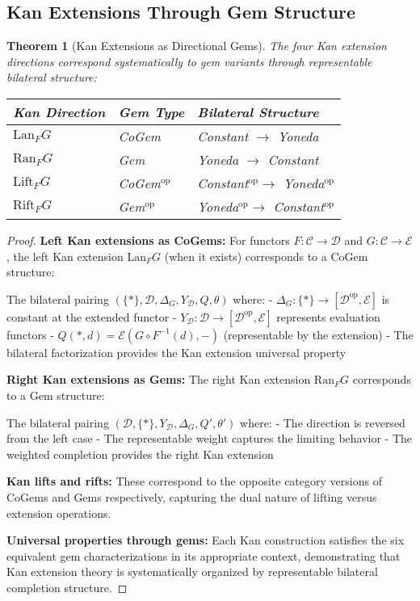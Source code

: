 \documentclass[11pt]{article}
\theoremstyle{plain}
\newtheorem{theorem}{Theorem}[section]
\theoremstyle{definition}
\theoremstyle{remark}
\newcommand{\C}{\mathcal{C}}
\newcommand{\D}{\mathcal{D}}
\newcommand{\E}{\mathcal{E}}
\newcommand{\op}{\mathrm{op}}
\begin{document}
\subsection{Kan Extensions Through Gem Structure}

\begin{theorem}[Kan Extensions as Directional Gems]\label{thm:kan-extensions-gems}
The four Kan extension directions correspond systematically to gem variants through representable bilateral structure:

\begin{center}
\begin{tabular}{|l|l|l|}
\hline
\textbf{Kan Direction} & \textbf{Gem Type} & \textbf{Bilateral Structure} \\
\hline
$\text{Lan}_F G$ & CoGem & Constant $\to$ Yoneda \\
$\text{Ran}_F G$ & Gem & Yoneda $\to$ Constant \\
$\text{Lift}_F G$ & CoGem$^{\op}$ & Constant$^{\op} \to$ Yoneda$^{\op}$ \\
$\text{Rift}_F G$ & Gem$^{\op}$ & Yoneda$^{\op} \to$ Constant$^{\op}$ \\
\hline
\end{tabular}
\end{center}
\end{theorem}

\begin{proof}
\textbf{Left Kan extensions as CoGems:}
For functors $F : \C \to \D$ and $G : \C \to \E$, the left Kan extension $\text{Lan}_F G$ (when it exists) corresponds to a CoGem structure:

The bilateral pairing $(\{\ast\}, \D, \Delta_G, Y_\D, Q, \theta)$ where:
- $\Delta_G : \{\ast\} \to [\D^{\op}, \E]$ is constant at the extended functor
- $Y_\D : \D \to [\D^{\op}, \E]$ represents evaluation functors
- $Q(\ast, d) = \E(G \circ F^{-1}(d), -)$ (representable by the extension)
- The bilateral factorization provides the Kan extension universal property

\textbf{Right Kan extensions as Gems:}
The right Kan extension $\text{Ran}_F G$ corresponds to a Gem structure:

The bilateral pairing $(\D, \{\ast\}, Y_\D, \Delta_G, Q', \theta')$ where:
- The direction is reversed from the left case
- The representable weight captures the limiting behavior
- The weighted completion provides the right Kan extension

\textbf{Kan lifts and rifts:}
These correspond to the opposite category versions of CoGems and Gems respectively, capturing the dual nature of lifting versus extension operations.

\textbf{Universal properties through gems:}
Each Kan construction satisfies the six equivalent gem characterizations in its appropriate context, demonstrating that Kan extension theory is systematically organized by representable bilateral completion structure.
\end{proof}
\end{document}
